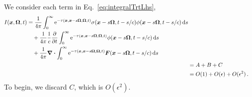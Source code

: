 We consider each term in Eq.~\eqref{eq:integralTrtLhs},
\begin{align*}
    \begin{split}
    I(\bm{x}, \bm{\Omega}, t)
    &=
    \frac{1}{4\pi}\int_{0}^{\infty}
    \mathop{}\!\mathrm{e}^{ -\tau(\bm{x}, \bm{x} - s \bm{\Omega}, \bm{\Omega}, t)}
    \sigma(\bm{x} - s \bm{\Omega}, t-s/c)
    \phi(\bm{x} - s \bm{\Omega}, t-s/c)
    \mathop{}\!\mathrm{d} s
    \\
    &\quad+ \frac{1}{4\pi}\frac{1}{c} \frac{\partial }{\partial t} \int_{0}^{\infty}
    \mathop{}\!\mathrm{e}^{ -\tau(\bm{x}, \bm{x} - s \bm{\Omega}, \bm{\Omega}, t)}
    \phi(\bm{x} - s \bm{\Omega}, t-s/c)
    \mathop{}\!\mathrm{d} s
    \\
    &\quad+ \frac{1}{4\pi}\bm{\nabla} \bm{\cdot} \int_{0}^{\infty}
    \mathop{}\!\mathrm{e}^{ -\tau(\bm{x}, \bm{x} - s \bm{\Omega}, \bm{\Omega}, t)}
    \bm{F}(\bm{x} - s \bm{\Omega}, t-s/c)
    \mathop{}\!\mathrm{d} s
    \end{split}
    \\
    &= A + B + C
    \\
    &= O(1) + O(\epsilon)+
    O(\epsilon^2)\,.
\end{align*}
To begin, we discard $C$, which is $O(\epsilon^2)$.

